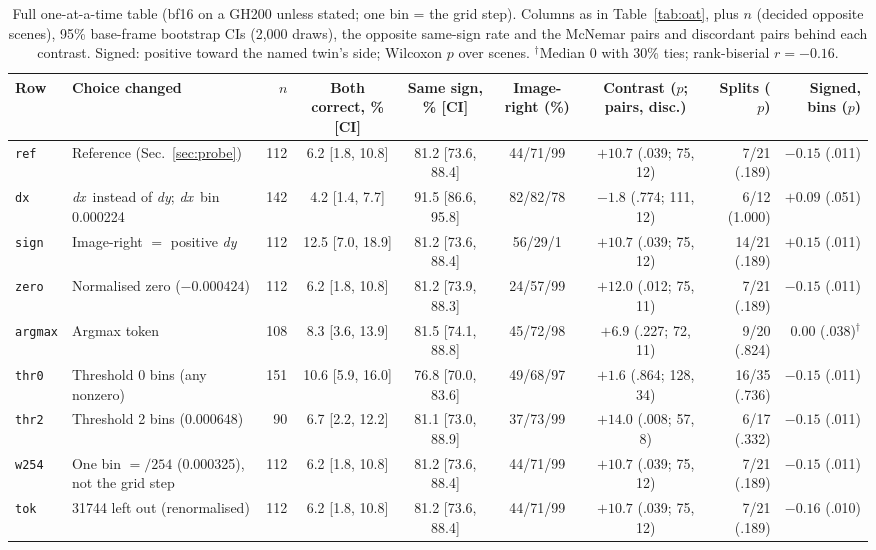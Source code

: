 \documentclass[conference]{IEEEtran}
\newcommand{\dy}{\textit{dy}}
\newcommand{\dx}{\textit{dx}}
\newcommand{\rowid}[1]{\texttt{#1}}
\begin{document}
\begin{table}[t]
\centering
\scriptsize
\setlength{\tabcolsep}{1.8pt}
\caption{Full one-at-a-time table (bf16 on a GH200 unless stated; one bin = the grid step). Columns as in Table~\ref{tab:oat}, plus $n$ (decided opposite scenes), 95\% base-frame bootstrap CIs (2,000 draws), the opposite same-sign rate and the McNemar pairs and discordant pairs behind each contrast. Signed: positive toward the named twin's side; Wilcoxon $p$ over scenes. $^\dagger$Median 0 with 30\% ties; rank-biserial $r=-0.16$.}
\label{tab:oatfull}
\begin{tabular}{@{}l L{3.5cm} r c c c c r r@{}}
\toprule
Row & Choice changed & $n$ & Both correct, \% [CI] & Same sign, \% [CI] & Image-right (\%) & Contrast ($p$; pairs, disc.) & Splits ($p$) & Signed, bins ($p$)\\
\midrule
\rowid{ref} & Reference (Sec.~\ref{sec:probe}) & 112 & 6.2 [1.8, 10.8] & 81.2 [73.6, 88.4] & 44/71/99 & $+10.7$ (.039; 75, 12) & 7/21 (.189) & $-0.15$ (.011)\\
\rowid{dx} & \dx\ instead of \dy; \dx\ bin 0.000224 & 142 & 4.2 [1.4, 7.7] & 91.5 [86.6, 95.8] & 82/82/78 & $-1.8$ (.774; 111, 12) & 6/12 (1.000) & $+0.09$ (.051)\\
\rowid{sign} & Image-right $=$ positive \dy & 112 & 12.5 [7.0, 18.9] & 81.2 [73.6, 88.4] & 56/29/1 & $+10.7$ (.039; 75, 12) & 14/21 (.189) & $+0.15$ (.011)\\
\rowid{zero} & Normalised zero ($-0.000424$) & 112 & 6.2 [1.8, 10.8] & 81.2 [73.9, 88.3] & 24/57/99 & $+12.0$ (.012; 75, 11) & 7/21 (.189) & $-0.15$ (.011)\\
\rowid{argmax} & Argmax token & 108 & 8.3 [3.6, 13.9] & 81.5 [74.1, 88.8] & 45/72/98 & $+6.9$ (.227; 72, 11) & 9/20 (.824) & $0.00$ (.038)$^\dagger$\\
\rowid{thr0} & Threshold 0 bins (any nonzero) & 151 & 10.6 [5.9, 16.0] & 76.8 [70.0, 83.6] & 49/68/97 & $+1.6$ (.864; 128, 34) & 16/35 (.736) & $-0.15$ (.011)\\
\rowid{thr2} & Threshold 2 bins (0.000648) & 90 & 6.7 [2.2, 12.2] & 81.1 [73.0, 88.9] & 37/73/99 & $+14.0$ (.008; 57, 8) & 6/17 (.332) & $-0.15$ (.011)\\
\rowid{w254} & One bin $=/254$ (0.000325), not the grid step & 112 & 6.2 [1.8, 10.8] & 81.2 [73.6, 88.4] & 44/71/99 & $+10.7$ (.039; 75, 12) & 7/21 (.189) & $-0.15$ (.011)\\
\rowid{tok} & 31744 left out (renormalised) & 112 & 6.2 [1.8, 10.8] & 81.2 [73.6, 88.4] & 44/71/99 & $+10.7$ (.039; 75, 12) & 7/21 (.189) & $-0.16$ (.010)\\

\end{tabular}
\end{table}
\end{document}
